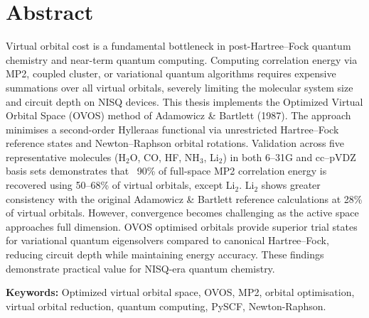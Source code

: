 \chapter*{Abstract}

\noindent

Virtual orbital cost is a fundamental bottleneck in post-Hartree–Fock quantum chemistry and near-term quantum computing. Computing correlation energy via MP2, coupled cluster, or variational quantum algorithms requires expensive summations over all virtual orbitals, severely limiting the molecular system size and circuit depth on NISQ devices. This thesis implements the Optimized Virtual Orbital Space (OVOS) method of Adamowicz \& Bartlett (1987). The approach minimises a second-order Hylleraas functional via unrestricted Hartree–Fock reference states and Newton–Raphson orbital rotations. Validation across five representative molecules  (H$_2$O, CO, HF, NH$_3$, Li$_2$)  in both 6--31G and cc--pVDZ basis sets demonstrates that ~90\% of full-space MP2 correlation energy is recovered using 50–68\% of virtual orbitals, except Li$_2$. Li$_2$ shows greater consistency with the original Adamowicz \& Bartlett reference calculations at 28\% of virtual orbitals. However, convergence becomes challenging as the active space approaches full dimension. OVOS optimised orbitals provide superior trial states for variational quantum eigensolvers compared to canonical Hartree–Fock, reducing circuit depth while maintaining energy accuracy. These findings demonstrate practical value for NISQ-era quantum chemistry.

\bigskip

\textbf{Keywords:} Optimized virtual orbital space, OVOS, MP2, orbital optimisation,
virtual orbital reduction, quantum computing, PySCF, Newton-Raphson.

